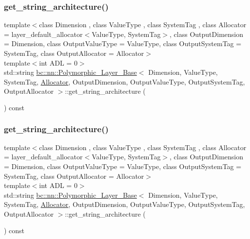 \subsubsection{\texorpdfstring{get\+\_\+string\+\_\+architecture()}{get\_string\_architecture()}\hspace{0.1cm}{\footnotesize\ttfamily [1/2]}}
{\footnotesize\ttfamily template$<$class Dimension , class Value\+Type , class System\+Tag , class Allocator  = layer\+\_\+default\+\_\+allocator$<$\+Value\+Type, System\+Tag$>$, class Output\+Dimension  = Dimension, class Output\+Value\+Type  = Value\+Type, class Output\+System\+Tag  = System\+Tag, class Output\+Allocator  = Allocator$>$ \\
template$<$int A\+DL = 0$>$ \\
std\+::string \hyperlink{structbc_1_1nn_1_1Polymorphic__Layer__Base}{bc\+::nn\+::\+Polymorphic\+\_\+\+Layer\+\_\+\+Base}$<$ Dimension, Value\+Type, System\+Tag, \hyperlink{classbc_1_1allocators_1_1Allocator}{Allocator}, Output\+Dimension, Output\+Value\+Type, Output\+System\+Tag, Output\+Allocator $>$\+::get\+\_\+string\+\_\+architecture (\begin{DoxyParamCaption}{ }\end{DoxyParamCaption}) const\hspace{0.3cm}{\ttfamily [inline]}}

\mbox{\label{structbc_1_1nn_1_1Polymorphic__Layer__Base_a987b737aeb1b1000dcb1b67ea551087b}} 
\subsubsection{\texorpdfstring{get\+\_\+string\+\_\+architecture()}{get\_string\_architecture()}\hspace{0.1cm}{\footnotesize\ttfamily [2/2]}}
{\footnotesize\ttfamily template$<$class Dimension , class Value\+Type , class System\+Tag , class Allocator  = layer\+\_\+default\+\_\+allocator$<$\+Value\+Type, System\+Tag$>$, class Output\+Dimension  = Dimension, class Output\+Value\+Type  = Value\+Type, class Output\+System\+Tag  = System\+Tag, class Output\+Allocator  = Allocator$>$ \\
template$<$int A\+DL = 0$>$ \\
std\+::string \hyperlink{structbc_1_1nn_1_1Polymorphic__Layer__Base}{bc\+::nn\+::\+Polymorphic\+\_\+\+Layer\+\_\+\+Base}$<$ Dimension, Value\+Type, System\+Tag, \hyperlink{classbc_1_1allocators_1_1Allocator}{Allocator}, Output\+Dimension, Output\+Value\+Type, Output\+System\+Tag, Output\+Allocator $>$\+::get\+\_\+string\+\_\+architecture (\begin{DoxyParamCaption}{ }\end{DoxyParamCaption}) const\hspace{0.3cm}{\ttfamily [inline]}}

